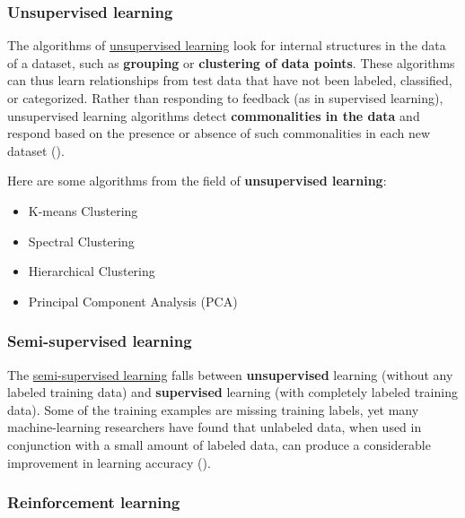 \documentclass [oneside,10pt,a4paper,ngerman,BCOR10mm,headsepline,parindent,final]{scrartcl}
\providecommand{\tightlist}{%
      \setlength{\itemsep}{0pt}\setlength{\parskip}{0pt}}
\begin{document}
    \hypertarget{unsupervised-learning}{%
\subsubsection{Unsupervised learning}\label{unsupervised-learning}}

The algorithms of
\href{https://en.wikipedia.org/wiki/Unsupervised_learning}{unsupervised
learning} look for internal structures in the data of a dataset, such as
\textbf{grouping} or \textbf{clustering of data points}. These
algorithms can thus learn relationships from test data that have not
been labeled, classified, or categorized. Rather than responding to
feedback (as in supervised learning), unsupervised learning algorithms
detect \textbf{commonalities in the data} and respond based on the
presence or absence of such commonalities in each new dataset
(\cite{Wiki_Unsupervised_learning}).

Here are some algorithms from the field of \textbf{unsupervised
learning}:

\begin{itemize}
\tightlist
\item
  K-means Clustering
\item
  Spectral Clustering
\item
  Hierarchical Clustering
\item
  Principal Component Analysis (PCA)
\end{itemize}

    \hypertarget{semi-supervised-learning}{%
\subsubsection{Semi-supervised
learning}\label{semi-supervised-learning}}

The
\href{https://en.wikipedia.org/wiki/Semi-supervised_learning}{semi-supervised
learning} falls between \textbf{unsupervised} learning (without any
labeled training data) and \textbf{supervised} learning (with completely
labeled training data). Some of the training examples are missing
training labels, yet many machine-learning researchers have found that
unlabeled data, when used in conjunction with a small amount of labeled
data, can produce a considerable improvement in learning accuracy
(\cite{Wiki_Semi-supervised_learning}).

    \hypertarget{reinforcement-learning}{%
\subsubsection{Reinforcement learning}\label{reinforcement-learning}}
\end{document}
